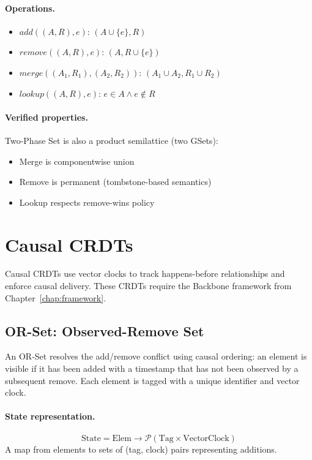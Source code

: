 \paragraph{Operations.}
\begin{itemize}
  \item $\mathit{add}((A, R), e)$: $(A \cup \{e\}, R)$
  \item $\mathit{remove}((A, R), e)$: $(A, R \cup \{e\})$
  \item $\mathit{merge}((A_1, R_1), (A_2, R_2))$: $(A_1 \cup A_2, R_1 \cup R_2)$
  \item $\mathit{lookup}((A, R), e)$: $e \in A \land e \notin R$
\end{itemize}

\paragraph{Verified properties.}
Two-Phase Set is also a product semilattice (two GSets):
\begin{itemize}
  \item Merge is componentwise union
  \item Remove is permanent (tombstone-based semantics)
  \item Lookup respects remove-wins policy
\end{itemize}

\section{Causal CRDTs}\label{sec:causal-crdts}

Causal CRDTs use vector clocks to track happens-before relationships and enforce causal delivery. These CRDTs require the Backbone framework from Chapter~\ref{chap:framework}.

\subsection{OR-Set: Observed-Remove Set}

An OR-Set resolves the add/remove conflict using causal ordering: an element is visible if it has been added with a timestamp that has not been observed by a subsequent remove. Each element is tagged with a unique identifier and vector clock.

\paragraph{State representation.}
\[
\text{State} = \text{Elem} \to \mathcal{P}(\text{Tag} \times \text{VectorClock})
\]
A map from elements to sets of (tag, clock) pairs representing additions.


